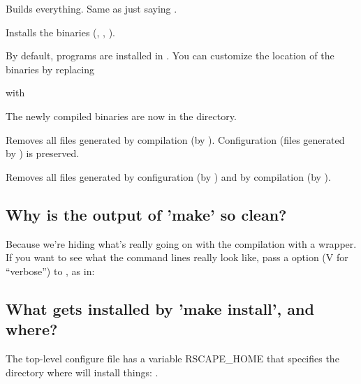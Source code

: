 \begin{sreitems}{}

\item[\emprog{all}]
  Builds everything. Same as just saying .

\item[\emprog{install}] 
  Installs the binaries (, , ).

  By default, programs are installed in
  . 
  You can customize the location of the binaries by replacing
  
  
  with
  
  
  The newly compiled binaries are now in the
   directory.\\
  
\item[\emprog{clean}]
  Removes all files generated by compilation (by
  ). Configuration (files generated by
  ) is preserved.

\item[\emprog{distclean}]
  Removes all files generated by configuration (by )
  and by compilation (by ). 

\end{sreitems}

\subsection{Why is the output of 'make' so clean?}

Because we're hiding what's really going on with the compilation with
a wrapper.  If you want to see what the command lines really look
like, pass a  option (V for ``verbose'') to ,
as in:


\subsection{What gets installed by 'make install', and where?}

The top-level configure file has a variable RSCAPE\_HOME that
specifies the directory where  will install
things: .\\

